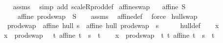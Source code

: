 \begin{isabellebody}
%
\isadelimproof
\ \ %
\endisadelimproof
%
\isatagproof
{}\isamarkupfalse%
\ assms\ \isamarkupfalse%
\ {\isacharparenleft}{\kern0pt}simp\ add{\isacharcolon}{\kern0pt}\ scaleR{\isacharunderscore}{\kern0pt}prod{\isacharunderscore}{\kern0pt}def{\isacharparenright}{\kern0pt}%
\endisatagproof
{\isafoldproof}%
%
\isadelimproof
\isanewline
%
\endisadelimproof
\isanewline
{}\isamarkupfalse%
\ affine{\isacharunderscore}{\kern0pt}swap{\isacharcolon}{\kern0pt}\isanewline
\ \ \ {\isachardoublequoteopen}affine\ S{\isachardoublequoteclose}\isanewline
\ \ \ \ \ {\isachardoublequoteopen}affine\ {\isacharparenleft}{\kern0pt}prod{\isachardot}{\kern0pt}swap\ {\isacharbackquote}{\kern0pt}\ S{\isacharparenright}{\kern0pt}{\isachardoublequoteclose}\isanewline
%
\isadelimproof
\ \ %
\endisadelimproof
%
\isatagproof
{}\isamarkupfalse%
\ assms\ \isamarkupfalse%
\ affine{\isacharunderscore}{\kern0pt}def\ \isamarkupfalse%
\ force%
\endisatagproof
{\isafoldproof}%
%
\isadelimproof
\isanewline
%
\endisadelimproof
\isanewline
\isanewline
{}\isamarkupfalse%
\ hull{\isacharunderscore}{\kern0pt}swap{\isacharunderscore}{\kern0pt}{}{\isacharcolon}{\kern0pt}\ \isanewline
\ \ {\isachardoublequoteopen}prod{\isachardot}{\kern0pt}swap\ {\isacharbackquote}{\kern0pt}\ {\isacharparenleft}{\kern0pt}affine\ hull\ s{\isacharparenright}{\kern0pt}\ {\isasymsubseteq}\ affine\ hull\ prod{\isachardot}{\kern0pt}swap\ {\isacharbackquote}{\kern0pt}\ s{\isachardoublequoteclose}\isanewline
%
\isadelimproof
\ \ \ \ %
\endisadelimproof
%
\isatagproof
{}\isamarkupfalse%
\ hull{\isacharunderscore}{\kern0pt}def\isanewline
{}\isamarkupfalse%
\isanewline
\ \ \isamarkupfalse%
\ x\ \isamarkupfalse%
\ {\isachardoublequoteopen}x\ {\isasymin}\ prod{\isachardot}{\kern0pt}swap\ {\isacharbackquote}{\kern0pt}\ {\isasymInter}\ {\isacharbraceleft}{\kern0pt}t{\isachardot}{\kern0pt}\ affine\ t\ {\isasymand}\ s\ {\isasymsubseteq}\ t{\isacharbraceright}{\kern0pt}{\isachardoublequoteclose}\isanewline
\ \ \isamarkupfalse%
\ {\isachardoublequoteopen}x\ {\isasymin}\ {\isasymInter}{\isacharbraceleft}{\kern0pt}prod{\isachardot}{\kern0pt}swap\ {\isacharbackquote}{\kern0pt}\ t{\isacharbar}{\kern0pt}\ t{\isachardot}{\kern0pt}\ affine\ t\ {\isasymand}\ s\ {\isasymsubseteq}\ t{\isacharbraceright}{\kern0pt}{\isachardoublequoteclose}\ \isamarkupfalse%

\end{isabellebody}
